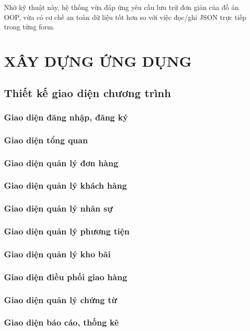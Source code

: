 \documentclass[12pt,a4paper]{article}
\begin{document}
Nhờ kỹ thuật này, hệ thống vừa đáp ứng yêu cầu lưu trữ đơn giản của đồ án OOP, vừa có cơ chế an toàn dữ liệu tốt hơn so với việc đọc/ghi JSON trực tiếp trong từng form.

\newpage
\section{XÂY DỰNG ỨNG DỤNG}
\subsection{Thiết kế giao diện chương trình}
\subsubsection{Giao diện đăng nhập, đăng ký}
\subsubsection{Giao diện tổng quan}
\subsubsection{Giao diện quản lý đơn hàng}
\subsubsection{Giao diện quản lý khách hàng}
\subsubsection{Giao diện quản lý nhân sự}
\subsubsection{Giao diện quản lý phương tiện}
\subsubsection{Giao diện quản lý kho bãi}
\subsubsection{Giao diện điều phối giao hàng}
\subsubsection{Giao diện quản lý chứng từ}
\subsubsection{Giao diện báo cáo, thống kê}
\end{document}

